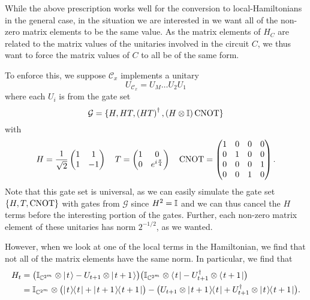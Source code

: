 \documentclass[../thesis-main/thesis-main]{subfiles}
\begin{document}
While the above prescription works well for the conversion to local-Hamiltonians in the general case, in the situation we are interested in we want all of the non-zero matrix elements to be the same value.  As the matrix elements of $H_C$ are related to the matrix values of the unitaries involved in the circuit $C$, we thus want to force the matrix values of $C$ to all be of the same form.

To enforce this, we suppose $\mathcal{C}_{x}$ implements a unitary 
\begin{equation}
U_{\mathcal{C}_{x}}=U_{M}\ldots U_{2}U_{1}\label{eq:single_qubit_circuit}
\end{equation}
 where each $U_{i}$ is from the gate set 
\begin{equation}
\mathcal{G}=\{H,HT,\left(HT\right)^{\dagger},\left(H\otimes\mathbb{I}\right)\mathrm{CNOT}\}
\end{equation}
with 
\begin{equation}
H=\frac{1}{\sqrt{2}}\begin{pmatrix}
1 & 1\\
1 & -1
\end{pmatrix} \quad T=\begin{pmatrix}
1 & 0\\
0 & e^{i\frac{\pi}{4}}
\end{pmatrix}\quad\mathrm{CNOT}=\begin{pmatrix}
1 & 0 & 0 & 0\\
0 & 1 & 0 & 0\\
0 & 0 & 0 & 1\\
0 & 0 & 1 & 0
\end{pmatrix}.
\end{equation}
Note that this gate set is universal, as we can easily simulate the gate set $\{H, T, \mathrm{CNOT}\}$ with gates from $\mathcal{G}$ since $H^2 = \mathbb{I}$ and we can thus cancel the $H$ terms before the interesting portion of the gates.  Further, each non-zero matrix element of these unitaries has norm $2^{-1/2}$, as we wanted.

However, when we look at one of the local terms in the Hamiltonian, we find that not all of the matrix elements have the same norm.  In particular, we find that
\begin{align}
  H_t &= \big(\mathbb{I}_{\mathbb{C}^{2^m}} \otimes |\mspace{2mu} t \mspace{2mu} \rangle - U_{t+1}\otimes|\mspace{2mu} t+1 \mspace{2mu} \rangle \big) \big(\mathbb{I}_{\mathbb{C}^{2^m}} \otimes \langle\mspace{2mu} t \mspace{2mu} | - U_{t+1}^\dag \otimes \langle\mspace{2mu} t+1 \mspace{2mu} |\big)\\
         &= \mathbb{I}_{\mathbb{C}^{2^m}} \otimes \big(|\mspace{2mu} t \mspace{2mu} \rangle\mspace{-2mu}\langle\mspace{2mu} t \mspace{2mu} | + |\mspace{2mu} t+1 \mspace{2mu} \rangle\mspace{-2mu}\langle\mspace{2mu} t+1 \mspace{2mu} |\big) - \big( U_{t+1} \otimes |\mspace{2mu} t+1 \mspace{2mu} \rangle\mspace{-2mu}\langle\mspace{2mu} t \mspace{2mu} | + U_{t+1}^\dag \otimes |\mspace{2mu} t \mspace{2mu} \rangle\mspace{-2mu}\langle\mspace{2mu} t+1 \mspace{2mu} |\big). \label{eq:circuit_to_Hamiltonian_term}
\end{align}
\end{document}
